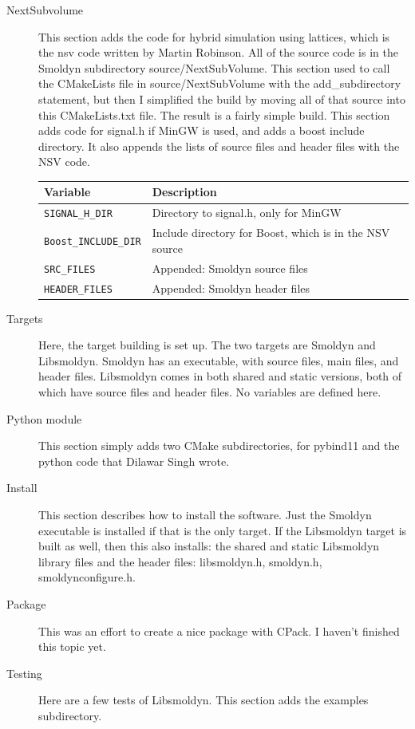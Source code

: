 \documentclass {scrbook}
\newcommand {\ttt} {\texttt}
\begin{document}
\begin{description}
\item[NextSubvolume]
This section adds the code for hybrid simulation using lattices, which is the nsv code written by Martin Robinson. All of the source code is in the Smoldyn subdirectory source/NextSubVolume. This section used to call the CMakeLists file in source/NextSubVolume with the add\_subdirectory statement, but then I simplified the build by moving all of that source into this CMakeLists.txt file. The result is a fairly simple build. This section adds code for signal.h if MinGW is used, and adds a boost include directory. It also appends the lists of source files and header files with the NSV code.
\begin{longtable}[c]{ll}
Variable & Description\\
\hline
\ttt{SIGNAL\_H\_DIR} & Directory to signal.h, only for MinGW\\
\ttt{Boost\_INCLUDE\_DIR} & Include directory for Boost, which is in the NSV source\\
\ttt{SRC\_FILES} & Appended: Smoldyn source files\\
\ttt{HEADER\_FILES} & Appended: Smoldyn header files\\
\end{longtable}

\item[Targets]
Here, the target building is set up. The two targets are Smoldyn and Libsmoldyn. Smoldyn has an executable, with source files, main files, and header files. Libsmoldyn comes in both shared and static versions, both of which have source files and header files. No variables are defined here.

\item[Python module]
This section simply adds two CMake subdirectories, for pybind11 and the python code that Dilawar Singh wrote.

\item[Install]
This section describes how to install the software. Just the Smoldyn executable is installed if that is the only target. If the Libsmoldyn target is built as well, then this also installs: the shared and static Libsmoldyn library files and the header files: libsmoldyn.h, smoldyn.h, smoldynconfigure.h.

\item[Package]
This was an effort to create a nice package with CPack. I haven't finished this topic yet.

\item[Testing]
Here are a few tests of Libsmoldyn. This section adds the examples subdirectory.

\end{description}
\end{document}
